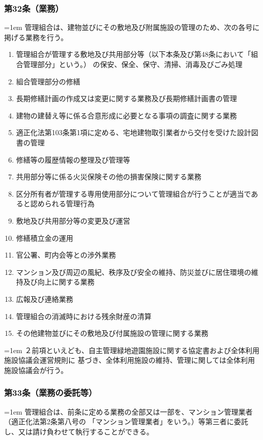 \documentclass[
  twoside,
  luatex,
  paper=a4paper,
  fontsize=11pt,
  jafontsize=11pt,
  jlreq_notes,
]{jlreq}
\newcommand{\joumain}[1]{%
  \noindent\hangindent=1em\hangafter=1
  \hspace{1em}#1%
}
\newcommand{\kou}[2]{%
  \par\noindent\hangindent=1em\hangafter=1
  #1\hspace{1em}#2%
}
\begin{document}
  \subsubsection*{第32条（業務）}
  \joumain{管理組合は、建物並びにその敷地及び附属施設の管理のため、次の各号に掲げる業務を行う。}
  \begin{enumerate}
    \item 管理組合が管理する敷地及び共用部分等（以下本条及び第48条において「組合管理部分」という。）
          の保安、保全、保守、清掃、消毒及びごみ処理
    \item 組合管理部分の修繕
    \item 長期修繕計画の作成又は変更に関する業務及び長期修繕計画書の管理
    \item 建物の建替え等に係る合意形成に必要となる事項の調査に関する業務
    \item 適正化法第103条第1項に定める、宅地建物取引業者から交付を受けた設計図書の管理
    \item 修繕等の履歴情報の整理及び管理等
    \item 共用部分等に係る火災保険その他の損害保険に関する業務
    \item 区分所有者が管理する専用使用部分について管理組合が行うことが適当であると認められる管理行為
    \item 敷地及び共用部分等の変更及び運営
    \item 修繕積立金の運用
    \item 官公署、町内会等との渉外業務
    \item マンション及び周辺の風紀、秩序及び安全の維持、防災並びに居住環境の維持及び向上に関する業務
    \item 広報及び連絡業務
    \item 管理組合の消滅時における残余財産の清算
    \item その他建物並びにその敷地及び付属施設の管理に関する業務
  \end{enumerate}
  \kou{２}{前項といえども、自主管理緑地遊園施設に関する協定書および全体利用施設協議会運営規則に
  基づき、全体利用施設の維持、管理に関しては全体利用施設協議会が行う。}

  \subsubsection*{第33条（業務の委託等）}
  \joumain{管理組合は、前条に定める業務の全部又は一部を、マンション管理業者（適正化法第2条第八号の
  「マンション管理業者」をいう。）等第三者に委託し、又は請け負わせて執行することができる。}
\end{document}
